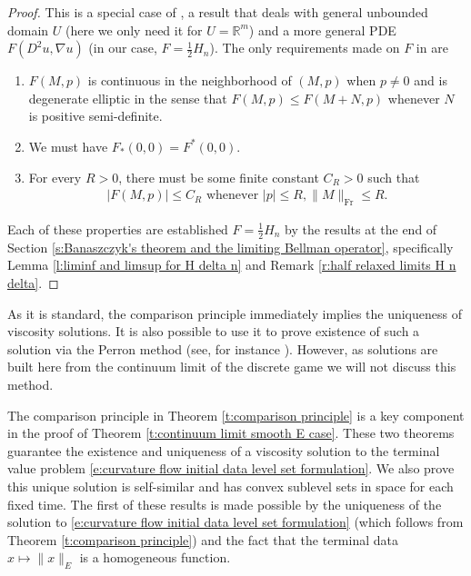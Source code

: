 \documentclass[reqno]{amsart}
\numberwithin{equation}{section}
\begin{document}
\begin{proof}
  This is a special case of \cite[Theorem 3.2]{GigaGotoIshiiSato1991}, a result that deals with general unbounded domain $U$ (here we only need it for $U=\mathbb{R}^m$) and a more general PDE $F(D^2u,\nabla u)$ (in our case, $F = \tfrac{1}{2}H_n$). The only requirements made on $F$ in \cite[Theorem 3.2]{GigaGotoIshiiSato1991} are

  \begin{enumerate}
      \item $F(M,p)$ is continuous in the neighborhood of $(M,p)$ when $p\neq 0$ and is degenerate elliptic in the sense that $F(M,p) \leq F(M+N,p)$ whenever $N$ is positive semi-definite. 
      \item We must have $F_*(0,0)=F^*(0,0)$. 
     \item For every $R>0$, there must be some finite constant $C_R>0$ such that 
     \begin{align*}
       |F(M,p)| \leq C_R \text{ whenever } |p|\leq R, \|M\|_{\text{Fr}}\leq R.    
     \end{align*}
  \end{enumerate}
  Each of these properties are established $F=\tfrac{1}{2}H_n$ by the results at the end of Section \ref{s:Banaszczyk's theorem and the limiting Bellman operator}, specifically Lemma \ref{l:liminf and limsup for H delta n} and Remark \ref{r:half relaxed limits H n delta}.
\end{proof}

As it is standard, the comparison principle immediately implies the uniqueness of viscosity solutions. It is also possible to use it to prove existence of such a solution via the Perron method (see, for instance \cite[Section 4]{crandall1992user}). However, as solutions are built here from the continuum limit of the discrete game we will not discuss this method. 

The comparison principle in Theorem \ref{t:comparison principle} is a key component in the proof of Theorem \ref{t:continuum limit smooth E case}. These two theorems guarantee the existence and uniqueness of a viscosity solution to the terminal value problem \eqref{e:curvature flow initial data level set formulation}. We also prove this unique solution is self-similar and has convex sublevel sets in space for each fixed time. The first of these results is made possible by the uniqueness of the solution to \eqref{e:curvature flow initial data level set formulation} (which follows from Theorem \ref{t:comparison principle}) and the fact that the terminal data $x\mapsto \|x\|_E$ is a homogeneous function.
\end{document}
